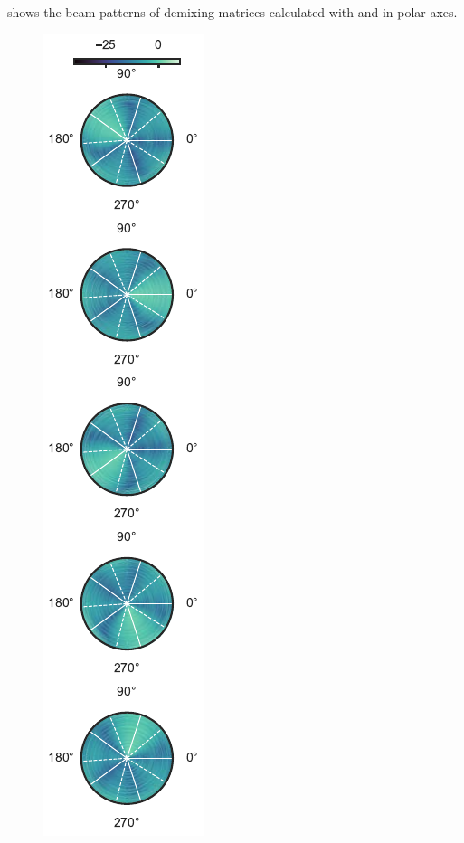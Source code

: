 \documentclass[sip,biber]{now-journal}
\begin{document}
 shows the beam patterns of demixing matrices calculated with \RTObs{} and \RTCov{} in polar axes.
\begin{figure}[t]
  \begin{minipage}[t]{.3\linewidth}
    \centering\includegraphics{figures/plots/beam-pattern/polar_RTcov_ref.pdf}\label{fig:plot:bp:pol:ref}
  \end{minipage}
  \begin{minipage}[t]{.3\linewidth}

\end{minipage}
\end{figure}
\end{document}
